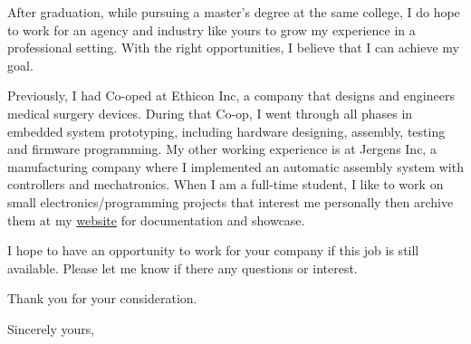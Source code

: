 \documentclass[11pt]{letter} %
\begin{document}
\begin{letter}
After graduation, while pursuing a master’s degree at the same college, I do hope to work for an agency and industry like yours to grow my experience in a professional setting. With the right opportunities, I believe that I can achieve my goal.

Previously, I had Co-oped at Ethicon Inc, a company that designs and engineers medical surgery devices. During that Co-op, I went through all phases in embedded system prototyping, including hardware designing, assembly, testing and firmware programming. My other working experience is at Jergens Inc, a manufacturing company where I implemented an automatic assembly system with controllers and mechatronics. When I am a full-time student, I like to work on small electronics/programming projects that interest me personally then archive them at my \href{https://liu2z2.github.io/}{website} for documentation and showcase. 

I hope to have an opportunity to work for your company if this job is still available. Please let me know if there any questions or interest. 

Thank you for your consideration.

\closing{Sincerely yours,}




\end{letter}
\end{document}
